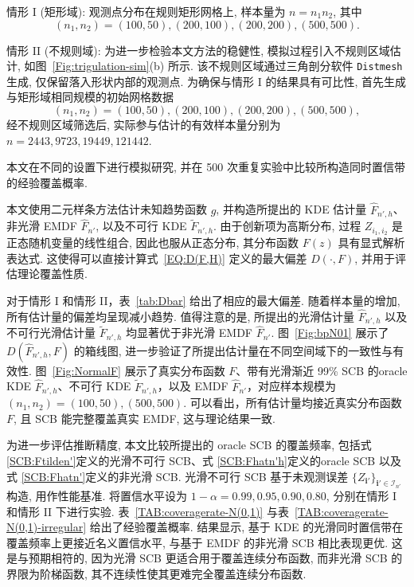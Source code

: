 \documentclass[a4paper,openay,14pt]{ctexbook}
\numberwithin{equation}{section}
\numberwithin{lem}{section}
\begin{document}
情形 I (矩形域): 观测点分布在规则矩形网格上, 样本量为 \( n = n_1 n_2 \), 其中  
\[
(n_1, n_2) = (100, 50), (200, 100), (200, 200), (500, 500).
\]

情形 II (不规则域): 为进一步检验本文方法的稳健性, 模拟过程引入不规则区域估计, 如图~\ref{Fig:trigulation-sim}(b) 所示. 该不规则区域通过三角剖分软件 \texttt{Distmesh} 生成, 仅保留落入形状内部的观测点. 为确保与情形 I 的结果具有可比性, 首先生成与矩形域相同规模的初始网格数据  
\[
(n_1, n_2) = (100, 50), (200, 100), (200, 200), (500, 500),
\]
经不规则区域筛选后, 实际参与估计的有效样本量分别为  
\(n = 2443, 9723, 19449, 121442.\)

本文在不同的设置下进行模拟研究, 并在 500 次重复实验中比较所构造同时置信带的经验覆盖概率.

本文使用二元样条方法估计未知趋势函数 \( g \), 并构造所提出的 KDE 估计量 \( \hat{F}_{n',h} \)、非光滑 EMDF \( \hat{F}_{n'} \), 以及不可行 KDE \( \tilde{F}_{n',h} \). 由于创新项为高斯分布, 过程 \( Z_{i_1,i_2} \) 是正态随机变量的线性组合, 因此也服从正态分布, 其分布函数 \( F(z) \) 具有显式解析表达式. 这使得可以直接计算式~\eqref{EQ:D(F,H)} 定义的最大偏差 \( D(\cdot, F) \), 并用于评估理论覆盖性质.

对于情形 I 和情形 II，表~\ref{tab:Dbar} 给出了相应的最大偏差. 随着样本量的增加, 所有估计量的偏差均呈现减小趋势. 值得注意的是, 所提出的光滑估计量 \( \hat{F}_{n',h} \) 以及不可行光滑估计量 \( \tilde{F}_{n',h} \) 均显著优于非光滑 EMDF \( \hat{F}_{n'} \). 图~\ref{Fig:bpN01} 展示了 \( D(\hat{F}_{n',h}, F) \) 的箱线图, 进一步验证了所提出估计量在不同空间域下的一致性与有效性. 图~\ref{Fig:NormalF} 展示了真实分布函数 \( F \)、带有光滑渐近 99\% SCB 的oracle KDE \( \hat{F}_{n',h} \)、不可行 KDE \( \tilde{F}_{n',h} \)，以及 EMDF $\hat{F}_{n'}$，对应样本规模为 \((n_1, n_2) = (100, 50), (500, 500).\) 可以看出，所有估计量均接近真实分布函数 \( F \), 且 SCB 能完整覆盖真实 EMDF, 这与理论结果一致.

为进一步评估推断精度, 本文比较所提出的 oracle SCB 的覆盖频率, 包括式 \eqref{SCB:Ftilden'}定义的光滑不可行 SCB、式 \eqref{SCB:Fhatn'h}定义的oracle SCB 以及式 \eqref{SCB:Fhatn'}定义的非光滑 SCB. 光滑不可行 SCB 基于未观测误差 \(\{Z_{\mathbf{i}'}\}_{\mathbf{i}'\in\mathcal{I}_{n'}}\) 构造, 用作性能基准. 将置信水平设为 \(1-\alpha = 0.99, 0.95, 0.90, 0.80\), 分别在情形 I 和情形 II 下进行实验. 表~\ref{TAB:coveragerate-N(0,1)} 与表~\ref{TAB:coveragerate-N(0,1)-irregular} 给出了经验覆盖概率. 结果显示, 基于 KDE 的光滑同时置信带在覆盖频率上更接近名义置信水平, 与基于 EMDF 的非光滑 SCB 相比表现更优. 这是与预期相符的, 因为光滑 SCB 更适合用于覆盖连续分布函数, 而非光滑 SCB 的界限为阶梯函数, 其不连续性使其更难完全覆盖连续分布函数.
\end{document}
